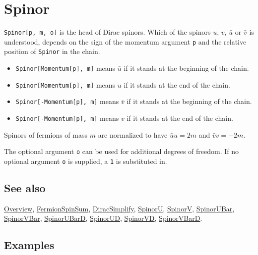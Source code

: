 \documentclass[../FeynCalcManual.tex]{subfiles}
\begin{document}
\hypertarget{spinor}{
\section{Spinor}\label{spinor}}

\texttt{Spinor[\allowbreak{}p,\ \allowbreak{}m,\ \allowbreak{}o]} is the
head of Dirac spinors. Which of the spinors \(u\), \(v\), \(\bar{u}\) or
\(\bar{v}\) is understood, depends on the sign of the momentum argument
\texttt{p} and the relative position of \texttt{Spinor} in the chain.

\begin{itemize}
\item
  \texttt{Spinor[\allowbreak{}Momentum[\allowbreak{}p],\ \allowbreak{}m]}
  means \(\bar{u}\) if it stands at the beginning of the chain.
\item
  \texttt{Spinor[\allowbreak{}Momentum[\allowbreak{}p],\ \allowbreak{}m]}
  means \(u\) if it stands at the end of the chain.
\item
  \texttt{Spinor[\allowbreak{}-Momentum[\allowbreak{}p],\ \allowbreak{}m]}
  means \(\bar{v}\) if it stands at the beginning of the chain.
\item
  \texttt{Spinor[\allowbreak{}-Momentum[\allowbreak{}p],\ \allowbreak{}m]}
  means \(v\) if it stands at the end of the chain.
\end{itemize}

Spinors of fermions of mass \(m\) are normalized to have
\(\bar{u} u=2 m\) and \(\bar{v} v=-2 m\).

The optional argument \texttt{o} can be used for additional degrees of
freedom. If no optional argument \texttt{o} is supplied, a \texttt{1} is
substituted in.

\subsection{See also}

\hyperlink{toc}{Overview}, \hyperlink{fermionspinsum}{FermionSpinSum},
\hyperlink{diracsimplify}{DiracSimplify}, \hyperlink{spinoru}{SpinorU},
\hyperlink{spinorv}{SpinorV}, \hyperlink{spinorubar}{SpinorUBar},
\hyperlink{spinorvbar}{SpinorVBar},
\hyperlink{spinorubard}{SpinorUBarD}, \hyperlink{spinorud}{SpinorUD},
\hyperlink{spinorvd}{SpinorVD}, \hyperlink{spinorvbard}{SpinorVBarD}.

\subsection{Examples}
\end{document}
